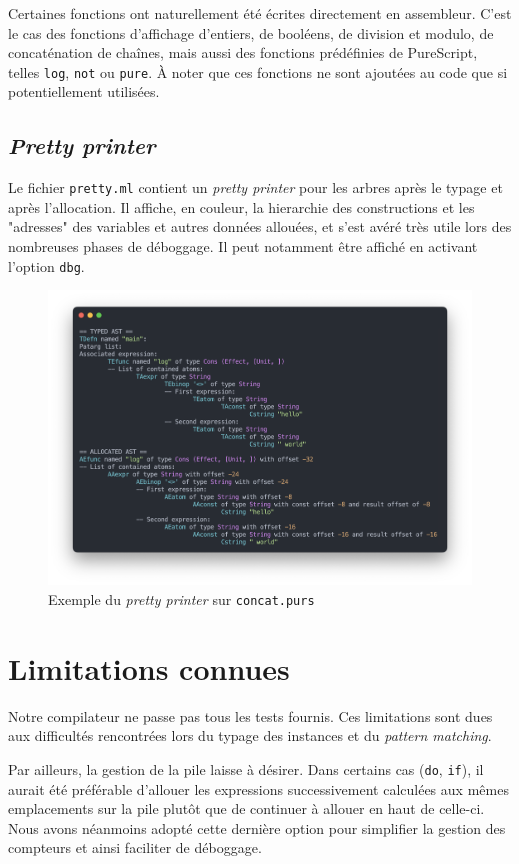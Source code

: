 \documentclass[12pt,a4paper]{article}
\begin{document}
Certaines fonctions ont naturellement été écrites directement en assembleur. C'est le cas des fonctions d'affichage d'entiers, de booléens, de division et modulo, de concaténation de chaînes, mais aussi des fonctions prédéfinies de PureScript, telles \texttt{log}, \texttt{not} ou \texttt{pure}. À noter que ces fonctions ne sont ajoutées au code que si potentiellement utilisées.

\subsection{\emph{Pretty printer}}
Le fichier \texttt{pretty.ml} contient un \emph{pretty printer} pour les arbres après le typage et après l'allocation. Il affiche, en couleur, la hierarchie des constructions et les "adresses" des variables et autres données allouées, et s'est avéré très utile lors des nombreuses phases de déboggage. Il peut notamment être affiché en activant l'option \texttt{\textendash \textendash dbg}.

\begin{figure}[!h]
    \center
    \includegraphics[scale=0.45]{pretty_printer.png}
    \caption{Exemple du \emph{pretty printer} sur \texttt{concat.purs}}
\end{figure}

\section{Limitations connues}
Notre compilateur ne passe pas tous les tests fournis. Ces limitations sont dues aux difficultés rencontrées lors du typage des instances et du \emph{pattern matching}.

Par ailleurs, la gestion de la pile laisse à désirer. Dans certains cas (\texttt{do}, \texttt{if}), il aurait été préférable d'allouer les expressions successivement calculées aux mêmes emplacements sur la pile plutôt que de continuer à allouer en haut de celle-ci. Nous avons néanmoins adopté cette dernière option pour simplifier la gestion des compteurs et ainsi faciliter de déboggage.
\end{document}
